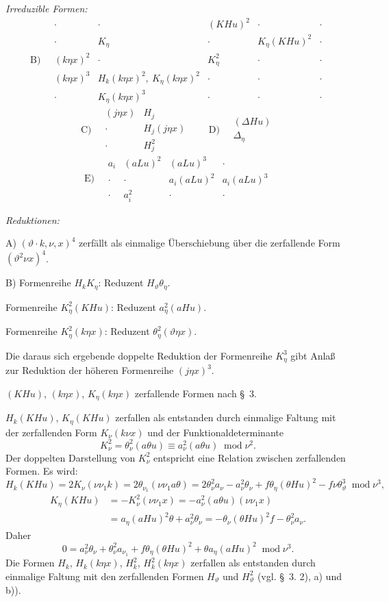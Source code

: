 \documentclass[11pt]{article}
\newcommand{\A}{\Delta}
\newcommand{\modu}[1]{\;\operatorname{mod} #1}
\providecommand{\modu}[1]{\;\operatorname{mod} #1}
\begin{document}
\noindent\emph{Irreduzible Formen:}
\[
\text{B)}\quad
\begin{array}{c|c|c|c|c}
\cdot&\cdot&(KHu)^2&\cdot&\cdot\\
\cdot&K_\eta&\cdot&K_\eta(KHu)^2&\cdot\\
(k\eta x)^2&\cdot&K_\eta^2&\cdot&\cdot\\
(k\eta x)^3&H_k(k\eta x)^2,\ K_\eta(k\eta x)^2&\cdot&\cdot&\cdot\\
\cdot&K_\eta(k\eta x)^3&\cdot&\cdot&\cdot
\end{array}
\]
\[
\text{C)}\quad
\begin{array}{cc}
(j\eta x)&H_j\\
\cdot&H_j(j\eta x)\\
\cdot&H_j^2
\end{array}
\qquad
\text{D)}\quad
\begin{array}{c}
(\A Hu)\\\A_\eta
\end{array}
\]
\[
\text{E)}\quad
\begin{array}{cccc}
a_i&(aLu)^2&(aLu)^3&\cdot\\
\cdot&\cdot&a_i(aLu)^2&a_i(aLu)^3\\
\cdot&a_i^2&\cdot&\cdot
\end{array}
\]

\noindent\emph{Reduktionen:}

\noindent A) $(\vartheta\cdot k,\nu,x)^4$ zerfällt als einmalige Überschiebung über die zerfallende Form $(\vartheta^2\nu x)^4$.

\noindent B) Formenreihe $H_kK_\eta$: Reduzent $H_\vartheta\theta_\eta$.

Formenreihe $K_\eta^2(KHu)$: Reduzent $a_\eta^2(aHu)$.

Formenreihe $K_\eta^2(k\eta x)$: Reduzent $\theta_\eta^2(\vartheta\eta x)$.

Die daraus sich ergebende doppelte Reduktion der Formenreihe $K_\eta^3$ gibt Anlaß zur Reduktion der höheren Formenreihe $(j\eta x)^3$.

$(KHu)$, $(k\eta x)$, $K_\eta(k\eta x)$ zerfallende Formen nach \S\ 3.

$H_k(KHu)$, $K_\eta(KHu)$ zerfallen als entstanden durch einmalige Faltung mit der zerfallenden Form $K_\nu(k\nu x)$ und der Funktionaldeterminante
\[
K_\nu^2=\theta_\nu^2(a\theta u)\equiv a_\nu^2(a\theta u)\modu{\nu^2}.
\]
Der doppelten Darstellung von $K_\nu^2$ entspricht eine Relation zwischen zerfallenden Formen. Es wird:
\[
H_k(KHu)=2K_\nu(\nu\nu_1k)=2\theta_{\nu_1}(\nu\nu_1a\theta)
=2\theta_\nu^2a_\nu-a_\nu^2\theta_\nu+f\theta_\eta(\theta Hu)^2-f\nu\theta_\vartheta^3
\modu{\nu^3},
\]
\[
\begin{aligned}
K_\eta(KHu)&=-K_\nu^2(\nu\nu_1x)
=-a_\nu^2(a\theta u)(\nu\nu_1x)\\
&=a_\eta(aHu)^2\theta+a_\nu^2\theta_\nu
=-\theta_\nu(\theta Hu)^2f-\theta_\nu^2a_\nu.
\end{aligned}
\]
Daher
\[
\tag{17}
0=a_\nu^2\theta_\nu+\theta_\nu^2a_{\nu_1}+f\theta_\eta(\theta Hu)^2+\theta a_\eta(aHu)^2\modu{\nu^3}.
\]
Die Formen $H_k$, $H_k(k\eta x)$, $H_k^2$, $H_k^2(k\eta x)$ zerfallen als entstanden durch einmalige Faltung mit den zerfallenden Formen $H_\vartheta$ und $H_\vartheta^2$ (vgl. \S\ 3. 2), a) und b)).
\end{document}
